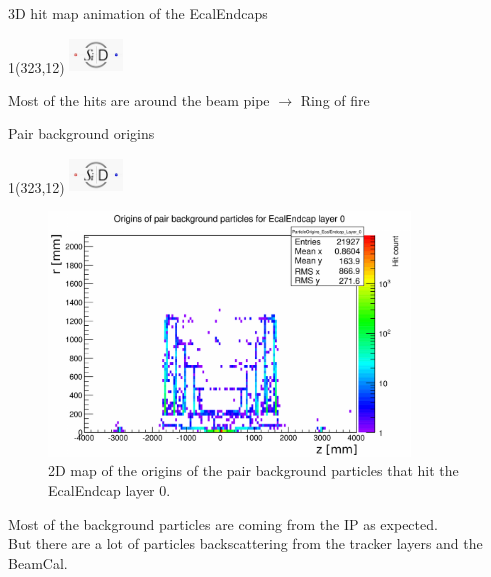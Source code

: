 \documentclass[xcolor={dvipsnames}]{beamer}
\newcommand{\sidlogo}{
  \setlength{\TPHorizModule}{1pt}
  \setlength{\TPVertModule}{1pt}
  \begin{textblock}{1}(323,12)
   \includegraphics[width=40pt,height=26pt]{figures/SiD.jpeg}
  \end{textblock}
  }
\begin{document}
\begin{frame}[t]{3D hit map animation of the EcalEndcaps}
\sidlogo
\begin{center}
\end{center}
Most of the hits are around the beam pipe $\rightarrow$ Ring of fire
\end{frame}

\begin{frame}{Pair background origins}
\sidlogo
  \begin{figure}
 	\begin{columns}
        \begin{flushright}
        \includegraphics[width=0.9\textwidth]{figures/sidloi3_pairs_1312_EcalEndcap_Hits_EcalEndcap_ParticleOrigins_EcalEndcap_Layer_0.pdf}
        \end{flushright}
        \begin{flushleft}
	\caption{\small 2D map of the origins of the pair background particles that hit the EcalEndcap layer 0.}
        \end{flushleft}
      \end{columns}
\end{figure}

Most of the background particles are coming from the IP as expected.\\
But there are a lot of particles backscattering from the tracker layers and the BeamCal.
\end{frame}
\end{document}
